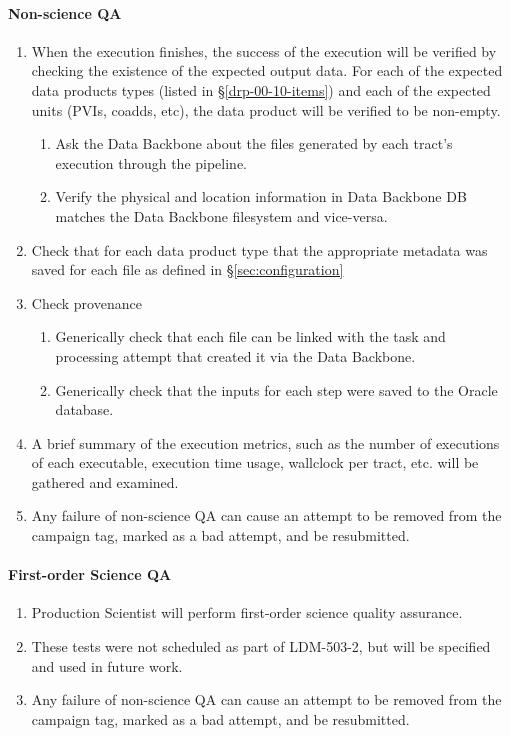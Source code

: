 \paragraph{Non-science QA}
\begin{enumerate}
  \item{When the execution finishes, the success of the execution will be verified by checking the existence of the expected output data.
  For each of the expected data products types (listed in \S\ref{drp-00-10-items})
  and each of the expected units (PVIs, coadds, etc), the data product will be
  verified to be non-empty.}
    \begin{enumerate}
        \item{Ask the Data Backbone about the files generated by each tract's execution through the pipeline.}
        \item{Verify the physical and location information in Data Backbone DB matches the Data Backbone filesystem and vice-versa.} 
    \end{enumerate}
  \item{Check that for each data product type that the appropriate metadata was saved for each file as defined in \S\ref{sec:configuration}}
  \item{Check provenance}
    \begin{enumerate}
        \item{Generically check that each file can be linked with the task and processing attempt that created it via the Data Backbone.}
        \item{Generically check that the inputs for each step were saved to the Oracle database.}
    \end{enumerate}
  \item{A brief summary of the execution metrics, such as the number of executions of each executable, execution time usage, wallclock per tract,
         etc. will be gathered and examined.}
  \item{Any failure of non-science QA can cause an attempt to be removed from the campaign tag, marked as a bad attempt, and be resubmitted.} 
\end{enumerate}

\paragraph{First-order Science QA}
\begin{enumerate}
  \item{Production Scientist will perform first-order science quality assurance.}
  \item{These tests were not scheduled as part of LDM-503-2, but will be specified and used in future work.}
  \item{Any failure of non-science QA can cause an attempt to be removed from the campaign tag, marked as a bad attempt, and be resubmitted.} 
\end{enumerate}
